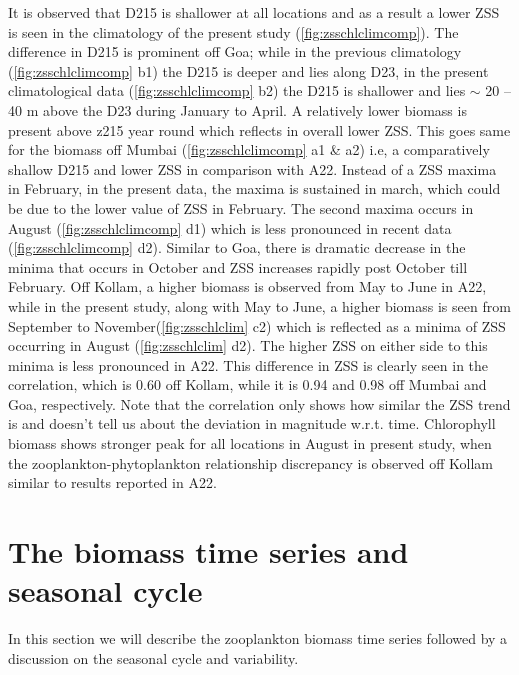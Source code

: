 \documentclass{article}
\begin{document}
	It is observed that D215 is shallower at all locations and as a result a lower ZSS is seen in the climatology of the present study (\cref{fig:zsschlclimcomp}). The difference in D215 is prominent off Goa; while in the previous climatology (\cref{fig:zsschlclimcomp} b1) the D215 is deeper and lies along D23, in the present climatological data (\cref{fig:zsschlclimcomp} b2) the D215 is shallower and lies $\sim$ 20 -- 40 m above the D23 during January to April. A relatively lower biomass is present above z215 year round which reflects in overall lower ZSS. This goes same for the biomass off Mumbai (\cref{fig:zsschlclimcomp} a1 \& a2) i.e, a comparatively shallow D215 and lower ZSS in comparison with A22. Instead of a ZSS maxima in February, in the present data, the maxima is sustained in march, which could be due to the lower value of ZSS in February. The second maxima occurs in August (\cref{fig:zsschlclimcomp} d1) which is less pronounced in recent data (\cref{fig:zsschlclimcomp} d2). Similar to Goa, there is dramatic decrease in the minima that occurs in October and ZSS increases rapidly post October till February.  Off Kollam, a higher biomass is observed from May to June in A22, while in the present study, along with May to June, a higher biomass is seen from September to November(\cref{fig:zsschlclim} c2) which is reflected as a minima of ZSS occurring in August (\cref{fig:zsschlclim} d2). The higher ZSS on either side to this minima is less pronounced in A22. This difference in ZSS is clearly seen in the correlation, which is 0.60 off Kollam, while it is 0.94 and 0.98 off Mumbai and Goa, respectively. Note that the correlation only shows how similar the ZSS trend is and doesn't tell us about the deviation in magnitude w.r.t. time. Chlorophyll biomass shows stronger peak for all locations in August in present study, when the zooplankton-phytoplankton relationship discrepancy is observed off Kollam similar to results reported in A22.
	 
	 
	\section{The biomass time series and seasonal cycle}
	In this section we will describe the zooplankton biomass time series followed by a discussion on the seasonal cycle and variability.
	
\end{document}
